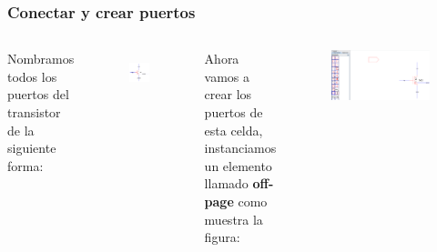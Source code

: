 \documentclass{beamer}
\begin{document}
\begin{frame}
\frametitle{Conectar y crear puertos}
\begin{columns}[t]
Nombramos todos los puertos del transistor de la siguiente forma:
\begin{figure}
  \includegraphics[width=0.75\linewidth]{figuras/edicionElectric-4c.png}\label{fig:nmosMin}
\end{figure}
Ahora vamos a crear los puertos de esta celda, instanciamos un elemento llamado \textbf{off-page} como muestra la figura:
\begin{figure}
\includegraphics[width=1.25\linewidth]{figuras/edicionElectric-4d.png}
\end{figure}
\end{columns}
\end{frame}
\end{document}
